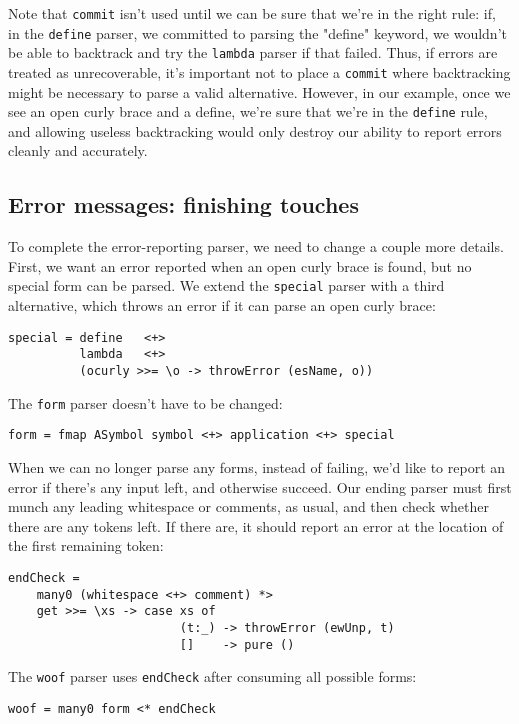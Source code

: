 \documentclass{tmr}
\begin{document}
Note that \verb+commit+ isn't used until we can be sure that we're in the right 
rule:  if, in the \verb+define+ parser, we committed to parsing the "define" 
keyword, we wouldn't be able to backtrack and try the \verb+lambda+ parser if 
that failed.  Thus, if errors are treated as unrecoverable, it's important not to 
place a \verb+commit+ where backtracking might be necessary to parse a valid 
alternative.  However, in our example, once 
we see an open curly brace and a define, we're sure that we're in the \verb+define+
rule, and allowing useless backtracking would only destroy our ability to report 
errors cleanly and accurately.

\subsection{Error messages:  finishing touches}
To complete the error-reporting parser, we need to change a couple more details. 
First, we want an error reported when an open curly brace is found, but no 
special form can be parsed.  We extend the \verb+special+ 
parser with a third alternative, which throws an error if it can parse
an open curly brace:
\begin{verbatim}
special = define   <+> 
          lambda   <+> 
          (ocurly >>= \o -> throwError (esName, o))
\end{verbatim}

The \verb+form+ parser doesn't have to be changed:
\begin{verbatim}
form = fmap ASymbol symbol <+> application <+> special
\end{verbatim}

When we can no longer parse any forms, instead of failing, we'd like to report 
an error if there's any input left, and otherwise succeed.  Our ending parser
must first munch any leading whitespace or comments, as usual, and then check 
whether there are any tokens left.  If there are, it should report an error at 
the location of the first remaining token:
\begin{verbatim}
endCheck = 
    many0 (whitespace <+> comment) *>
    get >>= \xs -> case xs of
                        (t:_) -> throwError (ewUnp, t)
                        []    -> pure ()
\end{verbatim}
The \verb+woof+ parser uses \verb+endCheck+ after consuming all possible forms:
\begin{verbatim}
woof = many0 form <* endCheck
\end{verbatim}
\end{document}
